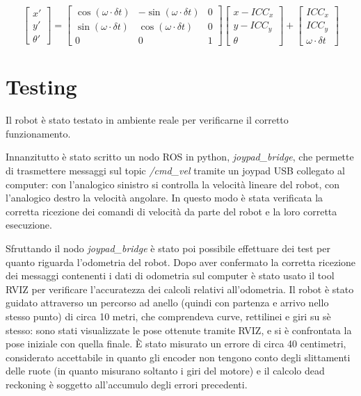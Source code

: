 \begin{displaymath}
    \begin{bmatrix} x' \\ y' \\ \theta'  \end{bmatrix}
    =
    \begin{bmatrix}
        \cos(\omega \cdot \delta t) & -\sin(\omega \cdot \delta t) & 0 \\
        \sin(\omega \cdot \delta t) & \cos(\omega \cdot \delta t) & 0 \\
        0 & 0 & 1
    \end{bmatrix}
    \begin{bmatrix}
        x - ICC_x \\
        y - ICC_y \\
        \theta
    \end{bmatrix}
    +
    \begin{bmatrix}
        ICC_x \\
        ICC_y \\
        \omega \cdot \delta t
   \end{bmatrix}
\end{displaymath}

\section{Testing}
Il robot è stato testato in ambiente reale per verificarne il corretto funzionamento.

Innanzitutto è stato scritto un nodo ROS in python, \textit{joypad\_bridge}, che permette di trasmettere messaggi sul topic \textit{/cmd\_vel} tramite un joypad USB collegato al computer: con l'analogico sinistro si controlla la velocità lineare del robot, con l'analogico destro la velocità angolare.
In questo modo è stata verificata la corretta ricezione dei comandi di velocità da parte del robot e la loro corretta esecuzione.

Sfruttando il nodo \textit{joypad\_bridge} è stato poi possibile effettuare dei test per quanto riguarda l'odometria del robot. Dopo aver confermato la corretta ricezione dei messaggi contenenti i dati di odometria sul computer è stato usato il tool RVIZ per verificare l'accuratezza dei calcoli relativi all'odometria. Il robot è stato guidato attraverso un percorso ad anello (quindi con partenza e arrivo nello stesso punto) di circa 10 metri, che comprendeva curve, rettilinei e giri su sè stesso: sono stati visualizzate le pose ottenute tramite RVIZ, e si è confrontata la pose iniziale con quella finale. È stato misurato un errore di circa 40 centimetri, considerato accettabile in quanto gli encoder non tengono conto degli slittamenti delle ruote (in quanto misurano soltanto i giri del motore) e il calcolo dead reckoning è soggetto all'accumulo degli errori precedenti.